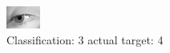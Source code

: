 \begin{figure}[h!]
\begin{center}
\includegraphics[width=0.60\columnwidth]{figures/ID2897_class_3_target_4.png}
\end{center}
\caption{ Classification: 3 actual target: 4}
\label{fig:ID2897_class_3_target_4}
\end{figure}
